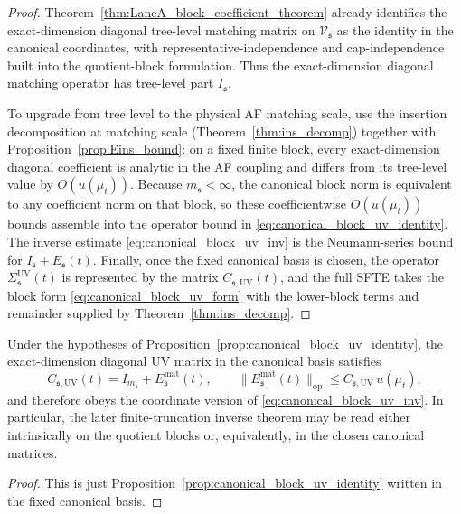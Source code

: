 \begin{proof}
Theorem~\ref{thm:LaneA_block_coefficient_theorem} already identifies the exact-dimension diagonal tree-level matching matrix on
$\mathscr V_{\mathfrak s}$ as the identity in the canonical coordinates, with representative-independence and cap-independence built into the quotient-block formulation.
Thus the exact-dimension diagonal matching operator has tree-level part $I_{\mathfrak s}$.

To upgrade from tree level to the physical AF matching scale, use the insertion decomposition at matching scale (Theorem~\ref{thm:ins_decomp}) together with
Proposition~\ref{prop:Eins_bound}: on a fixed finite block, every exact-dimension diagonal coefficient is analytic in the AF coupling and differs from its tree-level value by $O(u(\mu_t))$.
Because $m_{\mathfrak s}<\infty$, the canonical block norm is equivalent to any coefficient norm on that block, so these coefficientwise $O(u(\mu_t))$ bounds assemble into the operator bound in \eqref{eq:canonical_block_uv_identity}.
The inverse estimate \eqref{eq:canonical_block_uv_inv} is the Neumann-series bound for $I_{\mathfrak s}+E_{\mathfrak s}(t)$.
Finally, once the fixed canonical basis is chosen, the operator $\Sigma_{\mathfrak s}^{\mathrm{UV}}(t)$ is represented by the matrix $C_{\mathfrak s,\mathrm{UV}}(t)$, and the full SFTE takes the block form \eqref{eq:canonical_block_uv_form} with the lower-block terms and remainder supplied by Theorem~\ref{thm:ins_decomp}.
\end{proof}

\begin{corollary}\label{cor:canonical_block_matrix_theorem}
Under the hypotheses of Proposition~\ref{prop:canonical_block_uv_identity},
the exact-dimension diagonal UV matrix in the canonical basis satisfies
\[
C_{\mathfrak s,\mathrm{UV}}(t)=I_{m_{\mathfrak s}}+E^{\mathrm{mat}}_{\mathfrak s}(t),
\qquad
\|E^{\mathrm{mat}}_{\mathfrak s}(t)\|_{\mathrm{op}}\le C_{\mathfrak s,\mathrm{UV}}\,u(\mu_t),
\]
and therefore obeys the coordinate version of \eqref{eq:canonical_block_uv_inv}.
In particular, the later finite-truncation inverse theorem may be read either intrinsically on the quotient blocks or, equivalently, in the chosen canonical matrices.
\end{corollary}

\begin{proof}
This is just Proposition~\ref{prop:canonical_block_uv_identity} written in the fixed canonical basis.
\end{proof}

